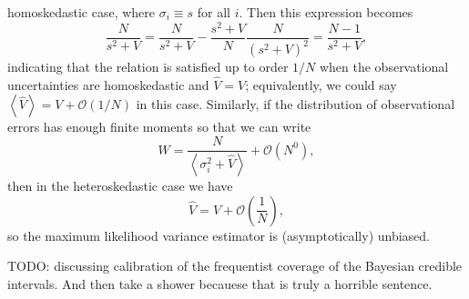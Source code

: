 \documentclass[modern]{aastex631}
\begin{document}
homoskedastic case, where $\sigma_i \equiv s$ for all $i$.  Then this expression
becomes 
\begin{equation}
    \frac{N}{s^2 + V} = \frac{N}{s^2 + V} - \frac{s^2 + V}{N}\frac{N}{\left( s^2 + V \right)^2} = \frac{N-1}{s^2 + V},
\end{equation}
indicating that the relation is satisfied up to order $1/N$ when the
observational uncertainties are homoskedastic and $\hat{V} = V$; equivalently,
we could say $\left\langle\hat{V}\right\rangle = V + \mathcal{O}\left( 1/ N
\right)$ in this case. Similarly, if the distribution of observational errors
has enough finite moments so that we can write 
\begin{equation}
    W = \frac{N}{\left\langle \sigma_i^2 + \hat{V} \right\rangle} + \mathcal{O}\left( N^0 \right),
\end{equation}
then in the heteroskedastic case we have 
\begin{equation}
    \hat{V} = V + \mathcal{O}\left( \frac{1}{N} \right),
\end{equation}
so the maximum likelihood variance estimator is (asymptotically) unbiased.

TODO: discussing calibration of the frequentist coverage of the Bayesian
credible intervals.  And then take a shower becauese that is truly a horrible
sentence.


\end{document}
